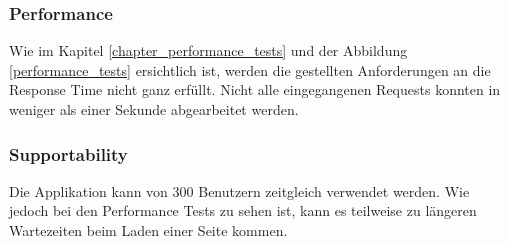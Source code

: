 
\subsubsection*{Performance}
Wie im Kapitel \ref{chapter_performance_tests} und der Abbildung \ref{performance_tests} ersichtlich ist, werden die gestellten Anforderungen an die Response Time nicht ganz erfüllt. Nicht alle eingegangenen Requests konnten in weniger als einer Sekunde abgearbeitet werden.

\subsubsection*{Supportability}

Die Applikation kann von 300 Benutzern zeitgleich verwendet werden. Wie jedoch bei den Performance Tests zu sehen ist, kann es teilweise zu längeren Wartezeiten beim Laden einer Seite kommen.













\newpage
